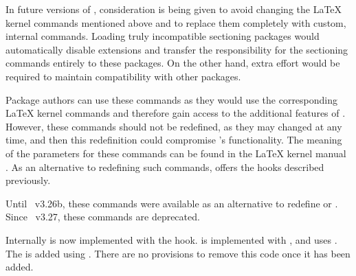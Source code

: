 In future versions of \KOMAScript{}, consideration is being given to avoid
changing the \LaTeX{} kernel commands mentioned above and to replace them
completely with custom, internal commands. Loading truly incompatible
sectioning packages would automatically disable \KOMAScript{} extensions
and transfer the responsibility for the sectioning commands entirely
to these packages. On the other hand, extra effort would be required
to maintain compatibility with other packages.

Package authors can use these commands as they would use the corresponding
\LaTeX{} kernel commands and therefore gain access to the additional features
of \KOMAScript. However, these commands should not be redefined, as they may
changed at any time, and then this redefinition could compromise
\KOMAScript{}'s functionality. The meaning of the parameters for these
commands can be found in the \LaTeX{} kernel manual \cite{latex:source2e}.
As an alternative to redefining such commands, \KOMAScript{}
offers the hooks described previously.%
\EndIndexGroup

\begin{Explain}
  \begin{Declaration}
  \end{Declaration}
  Until \KOMAScript~v3.26b, these commands were available as an
  alternative to redefine  or
  . Since \KOMAScript~v3.27, these commands are deprecated.

  Internally  is now implemented with the
   hook.  is
  implemented with , and
   uses
  . The  is added
  using . There are no provisions to remove
  this code once it has been added.%
  \EndIndexGroup
\end{Explain}




